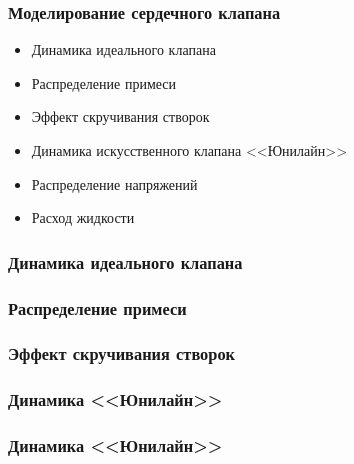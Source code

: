 \documentclass[14pt]{beamer}
\begin{document}
\begin{frame}
\frametitle{Моделирование сердечного клапана}
    \begin{itemize}
        \item[\MVRightarrow] Динамика идеального клапана
        \item[\MVRightarrow] Распределение примеси
        \item[\MVRightarrow] Эффект скручивания створок
        \item[\MVRightarrow] Динамика искусственного клапана <<Юнилайн>>
        \item[\MVRightarrow] Распределение напряжений
        \item[\MVRightarrow] Расход жидкости
    \end{itemize}
\end{frame}


\begin{frame}
\frametitle{Динамика идеального клапана}
\end{frame}

\begin{frame}
\frametitle{Распределение примеси}
\end{frame}

\begin{frame}
\frametitle{Эффект скручивания створок}
\end{frame}

\begin{frame}
\frametitle{Динамика <<Юнилайн>>}
\end{frame}

\begin{frame}
\frametitle{Динамика <<Юнилайн>>}
\end{frame}
\end{document}
